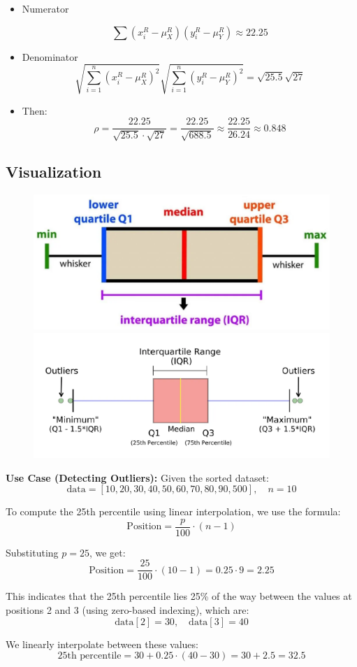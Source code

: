 \documentclass{article}
\begin{document}
\begin{enumerate}
\begin{itemize}
        \item Numerator

        \[
        \sum (x_i^R - \mu_X^R)(y_i^R - \mu_Y^R) \approx 22.25
        \]
      
        \item Denominator
        \[
        \sqrt{\sum_{i=1}^n (x_i^R - \mu_X^R)^2} \sqrt{\sum_{i=1}^n (y_i^R - \mu_Y^R)^2}
         = \sqrt{25.5} \sqrt{27}
        \]
        \item Then:
       \[
        \rho = \frac{22.25}{\sqrt{25.5} \cdot \sqrt{27}} = \frac{22.25}{\sqrt{688.5}} \approx \frac{22.25}{26.24} \approx 0.848
        \]
    \end{itemize}
\end{enumerate}

\subsection*{Visualization}
\begin{figure}[H]
\includegraphics[width=0.4\linewidth]{images/boxplot.png}
\includegraphics[width=0.4\linewidth]{images/boxplot2.png}
\end{figure}

\textbf{Use Case (Detecting Outliers):}
Given the sorted dataset:
\[
\text{data} = [10, 20, 30, 40, 50, 60, 70, 80, 90, 500], \quad n = 10
\]

To compute the 25th percentile using linear interpolation, we use the formula:
\[
\text{Position} = \frac{p}{100} \cdot (n - 1)
\]

Substituting \(p = 25\), we get:
\[
\text{Position} = \frac{25}{100} \cdot (10 - 1) = 0.25 \cdot 9 = 2.25
\]

This indicates that the 25th percentile lies 25\% of the way between the values at positions 2 and 3 (using zero-based indexing), which are:
\[
\text{data}[2] = 30, \quad \text{data}[3] = 40
\]

We linearly interpolate between these values:
\[
\text{25th percentile} = 30 + 0.25 \cdot (40 - 30) = 30 + 2.5 = 32.5
\]
\end{document}
